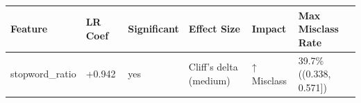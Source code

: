 \begin{tabular}{llllll}
\toprule
Feature & LR Coef & Significant & Effect Size & Impact & Max Misclass Rate \\
\midrule
stopword\_ratio & +0.942 & yes & Cliff's delta (medium) & ↑ Misclass & 39.7\% ((0.338, 0.571]) \\
\bottomrule
\end{tabular}
